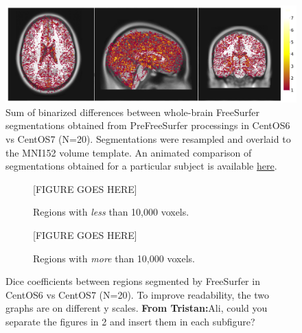 \documentclass[a4paper,num-refs]{oup-contemporary}
\newcommand{\tristan}[1]{\color{blue}\textbf{From Tristan:}#1\color{black}}
\begin{document}
\begin{figure}
\centering
  \includegraphics[width=\columnwidth]{images/brain_segmentation_mni.png} 
  \caption{Sum of binarized differences between whole-brain FreeSurfer
  segmentations obtained from PreFreeSurfer processings in CentOS6 vs CentOS7
   (N=20). Segmentations were resampled and overlaid to the MNI152 volume
  template. An animated comparison of segmentations obtained for a particular subject is available
\href{https://github.com/big-data-lab-team/HCP-reproducibility-paper/blob/master/images/fs_brain_segmentation.gif}
{here}.
} 
  \label{fig:tissue_class}
\end{figure}

\begin{figure}
  \centering
  \begin{subfigure}{0.45\linewidth}
    [FIGURE GOES HERE]
    \caption{Regions with \emph{less} than 10,000 voxels.}
  \end{subfigure}
  \hfill
  \begin{subfigure}{0.45\linewidth}
    [FIGURE GOES HERE]
    \caption{Regions with \emph{more} than 10,000 voxels.}
  \end{subfigure}
    \caption{Dice coefficients between regions segmented by FreeSurfer in CentOS6 vs CentOS7 (N=20).
        To improve readability, the two graphs are on different y scales. \tristan{Ali, could you separate the figures in 2 and insert them in each subfigure?}} 
    \label{fig:scatter_plot}
  \end{figure}

  
\end{document}

